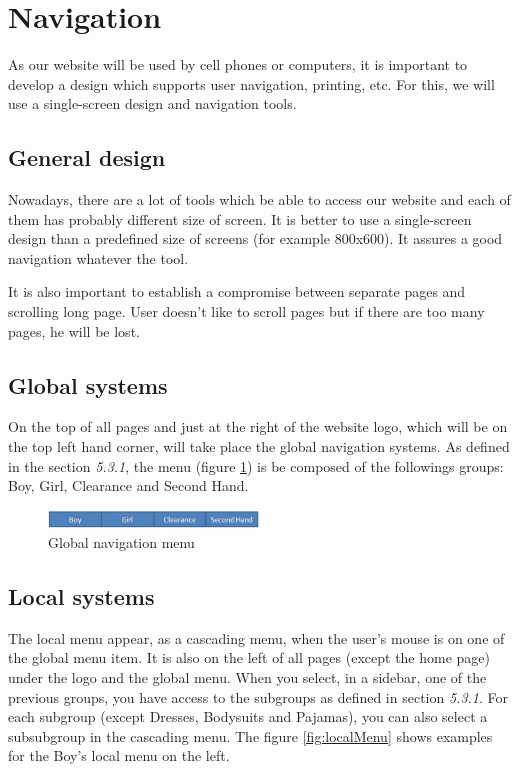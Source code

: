 \section{Navigation}

As our website will be used by cell phones or computers, it is important to develop a design which supports user navigation, printing, etc. For this, we will use a single-screen design and navigation tools.

\subsection{General design}

Nowadays, there are a lot of tools which be able to access our website and each of them has probably different size of screen. It is better to use a single-screen design than a predefined size of screens (for example 800x600). It assures a good navigation whatever the tool. 

It is also important to establish a compromise between separate pages and scrolling long page. User doesn't like to scroll pages but if there are too many pages, he will be lost.


\subsection{Global systems}

On the top of all pages and just at the right of the website logo, which will be on the top left hand corner, will take place the global navigation systems. As defined in the section \textit{5.3.1}, the menu (figure \ref{fig:globalMenu}) is be composed of the followings groups: Boy, Girl, Clearance and Second Hand.

\begin{figure}[h!]
  \centering  
  \includegraphics[width=0.5\textwidth]{Images/globalMenu.jpg}                
  \caption{Global navigation menu}
  \label{fig:globalMenu}
\end{figure}


\subsection{Local systems}
The local menu appear, as a cascading menu, when the user's mouse is on one of the global menu item. It is also on the left of all pages (except the home page) under the logo and the global menu. When you select, in a sidebar, one of the previous groups, you have access to the subgroups as defined in section \textit{5.3.1}. For each subgroup (except Dresses, Bodysuits and Pajamas), you can also select a subsubgroup in the cascading menu. The figure \ref{fig:localMenu} shows examples for the Boy's local menu on the left.

